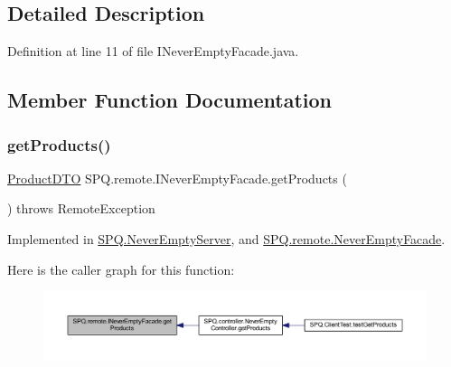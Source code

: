 \subsection{Detailed Description}


Definition at line 11 of file I\+Never\+Empty\+Facade.\+java.



\subsection{Member Function Documentation}
\mbox{\label{interface_s_p_q_1_1remote_1_1_i_never_empty_facade_a62d4a1747b8ba90f451fc9f9343055f3}} 
\subsubsection{\texorpdfstring{get\+Products()}{getProducts()}}
{\footnotesize\ttfamily \mbox{\hyperlink{class_s_p_q_1_1dto_1_1_product_d_t_o}{Product\+D\+TO}} S\+P\+Q.\+remote.\+I\+Never\+Empty\+Facade.\+get\+Products (\begin{DoxyParamCaption}{ }\end{DoxyParamCaption}) throws Remote\+Exception}



Implemented in \mbox{\hyperlink{class_s_p_q_1_1_never_empty_server_ad8c5a0afa259c6b8bcc2eb2444742ca2}{S\+P\+Q.\+Never\+Empty\+Server}}, and \mbox{\hyperlink{class_s_p_q_1_1remote_1_1_never_empty_facade_a4c8bdeeb3d2c3eb2c28aec1043e9274f}{S\+P\+Q.\+remote.\+Never\+Empty\+Facade}}.

Here is the caller graph for this function\+:\nopagebreak
\begin{figure}[H]
\begin{center}
\leavevmode
\includegraphics[width=350pt]{interface_s_p_q_1_1remote_1_1_i_never_empty_facade_a62d4a1747b8ba90f451fc9f9343055f3_icgraph}
\end{center}
\end{figure}
\mbox{\label{interface_s_p_q_1_1remote_1_1_i_never_empty_facade_aa329dfc23ab0832e73802bf2df90b9e0}} 
